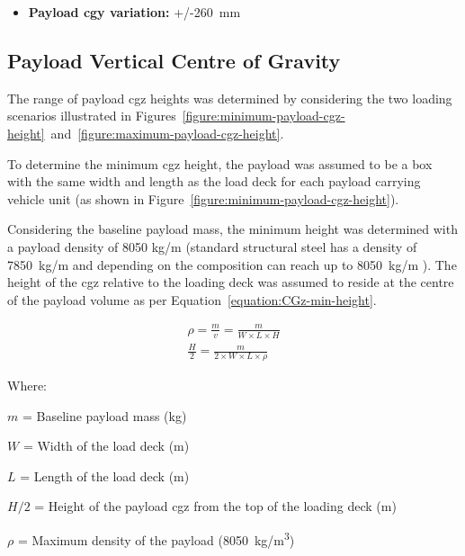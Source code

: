 \begin{itemize}
	\item \textbf{Payload \gls{cgy} variation:} +/-260~mm
\end{itemize}

\subsection{Payload Vertical Centre of Gravity}\label{section:pr-cgz-payload}

The range of payload \gls{cgz} heights was determined by considering the two loading scenarios illustrated in Figures~\ref{figure:minimum-payload-cgz-height}~and~\ref{figure:maximum-payload-cgz-height}.

To determine the minimum \gls{cgz} height, the payload was assumed to be a box with the same width and length as the load deck for each payload carrying vehicle unit (as shown in Figure~\ref{figure:minimum-payload-cgz-height}). 

Considering the baseline payload mass, the minimum height was determined with a payload density of 8050 kg/m\ssth{} (standard structural steel has a density of 7850~kg/m\ssth{} and depending on the composition can reach up to 8050~kg/m\ssth{} \cite{ThyssenkruppAerospace}). The height of the \gls{cgz} relative to the loading deck was assumed to reside at the centre of the payload volume as per Equation~\ref{equation:CGz-min-height}.

\begin{align}
	\rho = \frac{m}{v}=\frac{m}{W \times L \times  H}\\
	\label{equation:CGz-min-height}
	\frac{H}{2} = \frac{m}{2 \times W \times L \times \rho}
\end{align}

Where:

$m$ = Baseline payload mass (kg)

$W$ = Width of the load deck (m)

$L$ = Length of the load deck (m)

$H/2$ = Height of the payload \gls{cgz} from the top of the loading deck (m)

$\rho$ = Maximum density of the payload  (8050~kg/m\textsuperscript{3})


